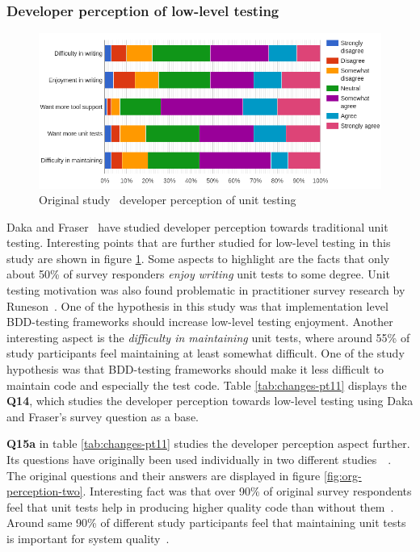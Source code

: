\subsubsection{Developer perception of low-level testing}
    \begin{figure}[ht]
      \begin{center}
        \includegraphics[width=14.7cm]{images/perception-org.png}
        \caption{Original study~\cite{daka2014survey} developer perception of unit testing}
        \label{fig:org-perception}
      \end{center}
    \end{figure}

Daka and Fraser~\cite{daka2014survey} have studied developer perception towards traditional unit testing. Interesting
points that are further studied for low-level testing in this study are shown in figure \ref{fig:org-perception}. Some
aspects to highlight are the facts that only about 50\% of survey responders \textit{enjoy writing} unit tests to some degree. Unit
testing motivation was also found problematic in practitioner survey research by Runeson~\cite{runeson2006survey}.
One of the hypothesis in this study was that implementation level BDD-testing frameworks should increase low-level testing enjoyment.
Another interesting aspect is the \textit{difficulty in maintaining} unit tests, where around 55\% of study participants
feel maintaining at least somewhat difficult. One of the study hypothesis was that BDD-testing frameworks should
make it less difficult to maintain code and especially the test code. Table \ref{tab:changes-pt11} displays the \textbf{Q14}, which studies
the developer perception towards low-level testing using Daka and Fraser's survey question as a base.

\textbf{Q15a} in table \ref{tab:changes-pt11} studies the developer perception aspect further. Its questions have originally
been used individually in two different studies~\cite{williams2009effectiveness}~\cite{li2016automatically}. The original
questions and their answers are displayed in figure \ref{fig:org-perception-two}. Interesting fact was that over 90\% of
original survey respondents feel that unit tests help in producing higher quality code than without them~\cite{williams2009effectiveness}.
Around same 90\% of different study participants feel that maintaining unit tests is important for system quality~\cite{li2016automatically}.

